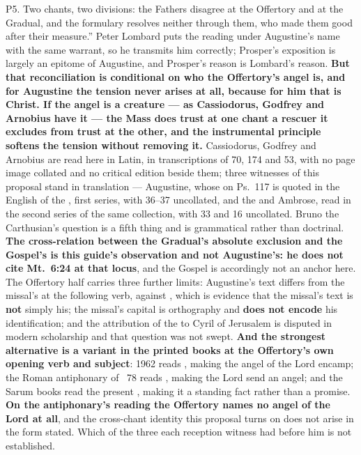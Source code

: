 \begin{proposal}{P5. Two chants, two divisions: the Fathers disagree at the Offertory and at the Gradual, and the formulary resolves neither}
{through them, who made them good after their measure.'' Peter Lombard puts the
reading under Augustine's name with the same warrant, so he transmits him
correctly; Prosper's exposition is largely an epitome of Augustine, and
Prosper's reason is Lombard's reason. \textbf{But that reconciliation is
conditional on who the Offertory's angel is, and for Augustine the tension never
arises at all, because for him that  is Christ. If the angel is a
creature --- as Cassiodorus, Godfrey and Arnobius have it --- the Mass does trust
at one chant a rescuer it excludes from trust at the other, and the instrumental
principle softens the tension without removing it.} Cassiodorus, Godfrey and Arnobius are read here in Latin, in
transcriptions of  70, 174 and 53, with no page image
collated and no critical edition beside them; three witnesses of this proposal
stand in translation --- Augustine, whose  on Ps.\ 117 is
quoted in the English of the , first
series, with  36--37 uncollated, and the
 and Ambrose, read in the second series of the
same collection, with  33 and 
16 uncollated. Bruno the Carthusian's
question is a fifth thing and is grammatical rather than doctrinal.
\textbf{The cross-relation between the Gradual's absolute exclusion and the
Gospel's  is this guide's observation
and not Augustine's: he does not cite Mt.\ 6:24 at that locus}, and the Gospel is
accordingly not an anchor here. The Offertory half carries three further limits:
Augustine's text differs from the missal's at the following verb, 
against , which is evidence that the missal's text is \textbf{not}
simply his; the missal's capital  is orthography and \textbf{does
not encode} his identification; and the attribution of the
 to Cyril of Jerusalem is disputed in modern
scholarship and that question was not swept. \textbf{And the strongest
alternative is a variant in the printed books at the Offertory's own opening
verb and subject}: 1962 reads , making the angel
of the Lord encamp; the Roman antiphonary of ~78 reads
, making the Lord send an angel; and the Sarum
books read the present , making it a standing fact rather than a
promise. \textbf{On the antiphonary's reading the Offertory names no angel of
the Lord at all}, and the cross-chant identity this proposal turns on does not
arise in the form stated. Which of the three each reception witness had before
him is not established.}
\end{proposal}

